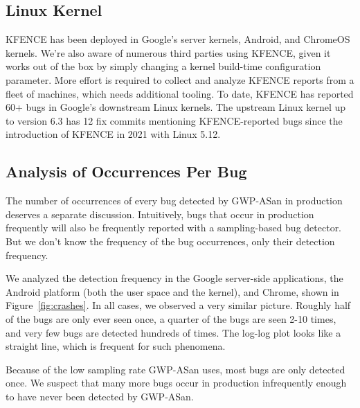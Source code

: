 \subsection{Linux Kernel}

KFENCE has been deployed in Google's server kernels, Android, and ChromeOS
kernels. We're also aware of numerous third parties using KFENCE, given it
works out of the box by simply changing a kernel build-time configuration
parameter. More effort is required to collect and analyze KFENCE reports from a
fleet of machines, which needs additional tooling. To date, KFENCE has reported
60+ bugs in Google's downstream Linux kernels. The upstream Linux kernel up to
version 6.3 has 12 fix commits mentioning KFENCE-reported bugs since the
introduction of KFENCE in 2021 with Linux 5.12.

\subsection{Analysis of Occurrences Per Bug}
\label{sec:occurrences_per_bug}

The number of occurrences of every bug detected by GWP-ASan in production
deserves a separate discussion. Intuitively, bugs that occur in production
frequently will also be frequently reported with a sampling-based bug detector.
But we don't know the frequency of the bug occurrences, only their detection
frequency.

We analyzed the detection frequency in the Google server-side applications, the
Android platform (both the user space and the kernel), and Chrome, shown in
Figure~\ref{fig:crashes}. In all cases, we observed a very similar picture.
Roughly half of the bugs are only ever seen once, a quarter of the bugs are
seen 2-10 times, and very few bugs are detected hundreds of times. The log-log
plot looks like a straight line, which is frequent for such phenomena.

Because of the low sampling rate GWP-ASan uses, most bugs are only detected
once. We suspect that many more bugs occur in production infrequently enough to
have never been detected by GWP-ASan.
